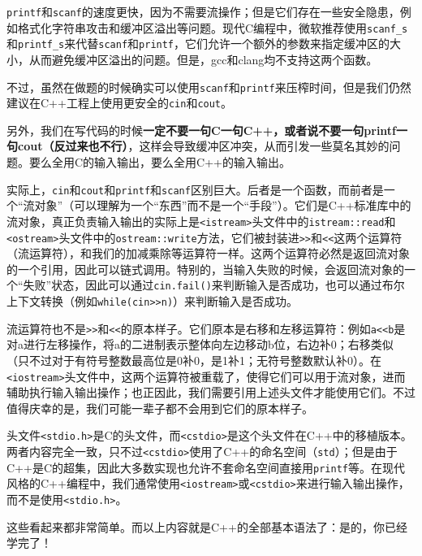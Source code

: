 \documentclass[../main.tex]{subfiles}
\begin{document}
\texttt{printf}和\texttt{scanf}的速度更快，因为不需要流操作；但是它们存在一些安全隐患，例如格式化字符串攻击和缓冲区溢出等问题。现代C编程中，微软推荐使用\texttt{scanf\_s}和\texttt{printf\_s}来代替\texttt{scanf}和\texttt{printf}，它们允许一个额外的参数来指定缓冲区的大小，从而避免缓冲区溢出的问题。但是，gcc和clang均不支持这两个函数。

不过，虽然在做题的时候确实可以使用\texttt{scanf}和\texttt{printf}来压榨时间，但是我们仍然建议在C++工程上使用更安全的\texttt{cin}和\texttt{cout}。

另外，我们在写代码的时候{\color{red}\textbf{一定不要一句C一句C++，或者说不要一句printf一句cout（反过来也不行）}}，这样会导致缓冲区冲突，从而引发一些莫名其妙的问题。要么全用C的输入输出，要么全用C++的输入输出。

\begin{note}
  实际上，\texttt{cin}和\texttt{cout}和\texttt{printf}和\texttt{scanf}区别巨大。后者是一个函数，而前者是一个“流对象”（可以理解为一个“东西”而不是一个“手段”）。它们是C++标准库中的流对象，真正负责输入输出的实际上是\texttt{<istream>}头文件中的\texttt{istream::read}和\texttt{<ostream>}头文件中的\texttt{ostream::write}方法，它们被封装进\texttt{>>}和\texttt{<<}这两个运算符（流运算符），和我们的加减乘除等运算符一样。这两个运算符必然是返回流对象的一个引用，因此可以链式调用。特别的，当输入失败的时候，会返回流对象的一个“失败”状态，因此可以通过\texttt{cin.fail()}来判断输入是否成功，也可以通过布尔上下文转换（例如\texttt{while(cin>>n)}）来判断输入是否成功。

  流运算符也不是\texttt{>>}和\texttt{<<}的原本样子。它们原本是右移和左移运算符：例如\texttt{a<<b}是对a进行左移操作，将a的二进制表示整体向左边移动b位，右边补0；右移类似（只不过对于有符号整数最高位是0补0，是1补1；无符号整数默认补0）。在\texttt{<iostream>}头文件中，这两个运算符被重载了，使得它们可以用于流对象，进而辅助执行输入输出操作；也正因此，我们需要引用上述头文件才能使用它们。不过值得庆幸的是，我们可能一辈子都不会用到它们的原本样子。

  头文件\texttt{<stdio.h>}是C的头文件，而\texttt{<cstdio>}是这个头文件在C++中的移植版本。两者内容完全一致，只不过\texttt{<cstdio>}使用了C++的命名空间（\texttt{std}）；但是由于C++是C的超集，因此大多数实现也允许不套命名空间直接用\texttt{printf}等。在现代风格的C++编程中，我们通常使用\texttt{<iostream>}或\texttt{<cstdio>}来进行输入输出操作，而不是使用\texttt{<stdio.h>}。
\end{note}

这些看起来都非常简单。而以上内容就是C++的全部基本语法了：是的，你已经学完了！
\end{document}
